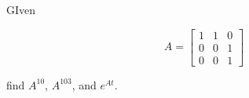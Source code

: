 \item [3.21] GIven

\begin{equation*}
 A = \begin{bmatrix}
      1 & 1 & 0\\
      0 & 0 & 1\\
      0 & 0 & 1
     \end{bmatrix}
\end{equation*}

find $A^{10}$, $A^{103}$, and $e^{At}$.
